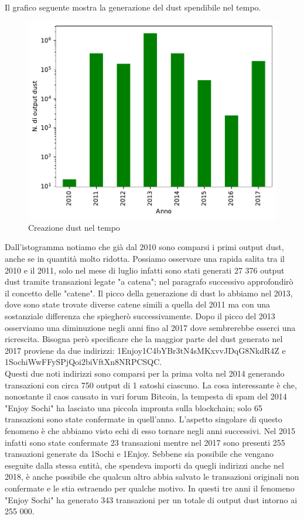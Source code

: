 Il grafico seguente mostra la generazione del dust spendibile nel tempo.
\begin{figure}[h!]
    \centering
    \includegraphics[scale=0.9]{Grafici/dust_created_year.pdf}
    \caption{Creazione dust nel tempo}
    \label{fig:dust_created}
\end{figure}
\FloatBarrier 
Dall'istogramma notiamo che già dal 2010 sono comparsi i primi output dust, anche se in quantità molto ridotta. Possiamo osservare una rapida salita tra il 2010 e il 2011, solo nel mese di luglio infatti sono stati generati 27 376 output dust tramite transazioni legate "a catena"; nel paragrafo successivo approfondirò il concetto delle "catene". 
Il picco della generazione di dust lo abbiamo nel 2013, dove sono state trovate diverse catene simili a quella del 2011 ma con una sostanziale differenza che spiegherò successivamente. Dopo il picco del 2013 osserviamo una diminuzione negli anni fino al 2017 dove sembrerebbe esserci una ricrescita. Bisogna però specificare che la maggior parte del dust generato nel 2017 proviene da due indirizzi: 1Enjoy1C4bYBr3tN4sMKxvvJDqG8NkdR4Z e 1SochiWwFFySPjQoi2biVftXn8NRPCSQC.\\Questi due noti indirizzi sono comparsi per la prima volta nel 2014 generando transazioni con circa 750 output di 1 satoshi ciascuno. La cosa interessante è che, nonostante il caos causato in vari forum Bitcoin, la tempesta di spam del 2014 "Enjoy Sochi" ha lasciato una piccola impronta sulla blockchain; solo 65 transazioni sono state confermate in quell'anno. L'aspetto singolare di questo fenomeno è che abbiamo visto echi di esso tornare negli anni successivi. Nel 2015 infatti sono state confermate 23 transazioni mentre nel 2017 sono presenti 255 transazioni generate da 1Sochi e 1Enjoy. Sebbene sia possibile che vengano eseguite dalla stessa entità, che spendeva importi da quegli indirizzi anche nel 2018, è anche possibile che qualcun altro abbia salvato le transazioni originali non confermate e le stia estraendo per qualche motivo. In questi tre anni il fenomeno "Enjoy Sochi" ha generato 343 transazioni per un totale di output dust intorno ai 255 000.\\\\
